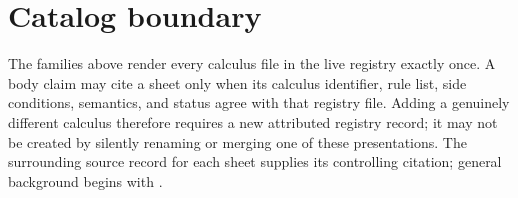 \section{Catalog boundary}

The families above render every calculus file in the live registry exactly
once. A body claim may cite a sheet only when
its calculus identifier, rule list, side conditions, semantics, and status
agree with that registry file. Adding a genuinely different calculus therefore
requires a new attributed registry record; it may not be created by silently
renaming or merging one of these presentations. The surrounding source record
for each sheet supplies its controlling citation; general background begins
with \cite{Prawitz1965,RobinsonVoronkov2001,BlackburnDeRijkeVenema2001}.
